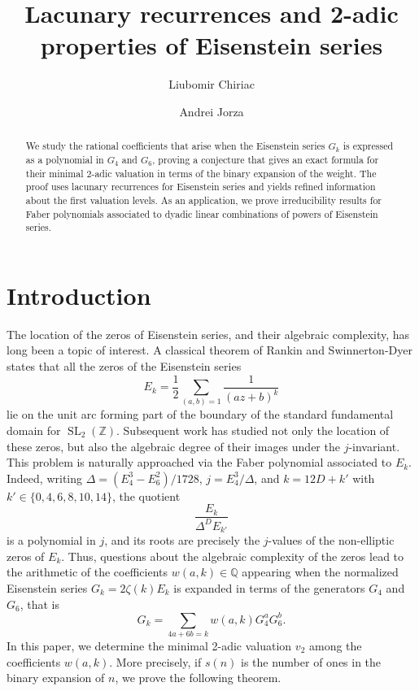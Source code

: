 \documentclass[12pt]{amsart}
\title{\textbf{Lacunary recurrences and 2-adic properties of Eisenstein series}}
\author{Liubomir Chiriac}
\author{Andrei Jorza}
\date{}
\newcommand{\SL}{\operatorname{SL}}
\begin{document}

\maketitle

\begin{abstract}
We study the rational coefficients that arise when the Eisenstein series $G_k$ is expressed as a polynomial in $G_4$ and $G_6$, proving a conjecture that gives an exact formula for their minimal 2-adic valuation in terms of the binary expansion of the weight. The proof uses lacunary recurrences for Eisenstein series and yields refined information about the first valuation levels. As an application, we prove irreducibility results for
Faber polynomials associated to dyadic linear combinations of powers of
Eisenstein series. 
\end{abstract}

\section{Introduction}
The location of the zeros of Eisenstein series, and their algebraic
complexity, has long been a topic of interest. A classical theorem of Rankin and Swinnerton-Dyer \cite{rankin-swinnerton-dyer} states that
all the zeros of the Eisenstein series
\[E_k=\frac{1}{2}\sum_{(a,b)=1}\frac{1}{(az+b)^k}\]
lie on the unit arc forming part of the boundary of the standard fundamental
domain for $\SL_2(\mathbb{Z})$. Subsequent work has studied not only
the location of these zeros, but also the algebraic degree of their images
under the $j$-invariant. This problem is naturally approached via the Faber
polynomial associated to $E_k$. Indeed, writing $\Delta=(E_4^3-E_6^2)/1728$, $j=E_4^3/\Delta$, and $k=12D+k'$ with $k'\in\{0,4,6,8,10,14\}$, the quotient 
\[
\frac{E_k}{\Delta^D E_{k'}}
\]
is a polynomial in $j$, and its roots are precisely the $j$-values of the non-elliptic zeros of $E_k$. Thus, questions about the algebraic complexity of the zeros lead to the arithmetic of the coefficients $w(a,k) \in \mathbb{Q}$ appearing when the normalized Eisenstein series $G_k=2 \zeta(k)E_k$ is expanded in terms of the generators $G_4$ and $G_6$, that is   
$$G_k = \sum_{4a+6b=k} w(a,k) G_4^a G_6^b.$$
In this paper, we determine the minimal 2-adic valuation $v_2$ among the coefficients $w(a,k)$. More precisely, if $s(n)$ is the number of ones in the binary expansion of $n$, we prove the following theorem.
\end{document}
